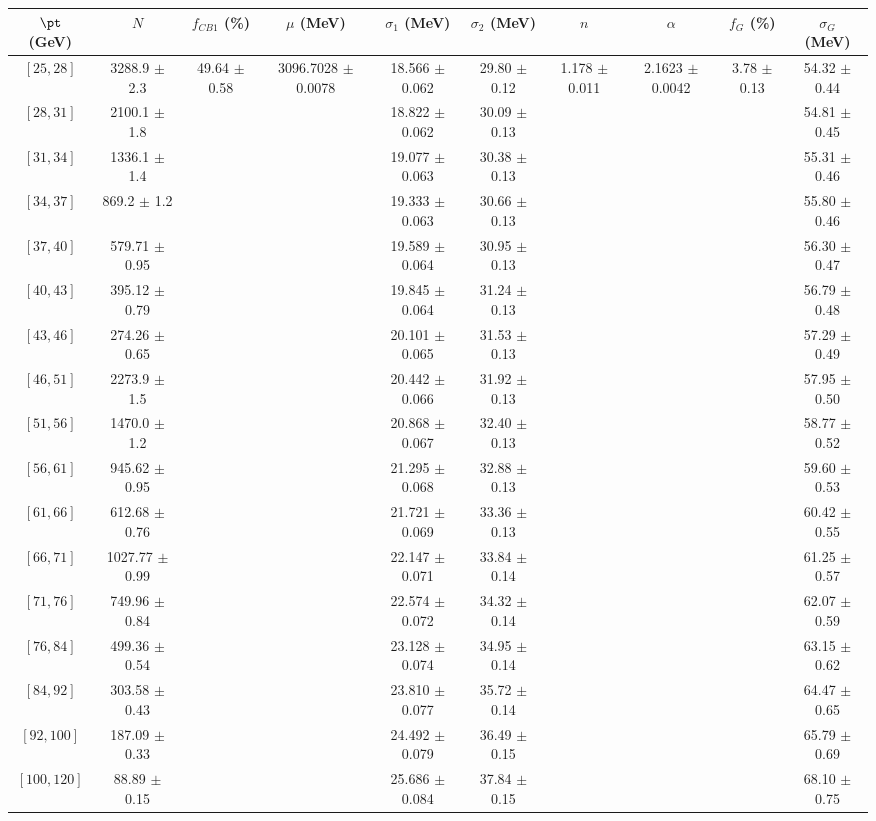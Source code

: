 \begin{tabular}{c||c|c|c|c|c|c|c|c|c}
$\pt$ (GeV) & $N$ & $f_{CB1}$ (\%)  & $\mu$ (MeV) & $\sigma_1$ (MeV) & $\sigma_2$ (MeV) & $n$ & $\alpha$ & $f_G$ (\%) & $\sigma_G$ (MeV) \\
\hline
$[25, 28]$ & 3288.9 $\pm$ 2.3 & \multirow{17}{*}{49.64 $\pm$ 0.58} & \multirow{17}{*}{3096.7028 $\pm$ 0.0078} & 18.566 $\pm$ 0.062 & 29.80 $\pm$ 0.12 & \multirow{17}{*}{1.178 $\pm$ 0.011} & \multirow{17}{*}{2.1623 $\pm$ 0.0042} & \multirow{17}{*}{3.78 $\pm$ 0.13} & 54.32 $\pm$ 0.44\\
$[28, 31]$ & 2100.1 $\pm$ 1.8 &  &  & 18.822 $\pm$ 0.062 & 30.09 $\pm$ 0.13 &  &  &  & 54.81 $\pm$ 0.45\\
$[31, 34]$ & 1336.1 $\pm$ 1.4 &  &  & 19.077 $\pm$ 0.063 & 30.38 $\pm$ 0.13 &  &  &  & 55.31 $\pm$ 0.46\\
$[34, 37]$ & 869.2 $\pm$ 1.2 &  &  & 19.333 $\pm$ 0.063 & 30.66 $\pm$ 0.13 &  &  &  & 55.80 $\pm$ 0.46\\
$[37, 40]$ & 579.71 $\pm$ 0.95 &  &  & 19.589 $\pm$ 0.064 & 30.95 $\pm$ 0.13 &  &  &  & 56.30 $\pm$ 0.47\\
$[40, 43]$ & 395.12 $\pm$ 0.79 &  &  & 19.845 $\pm$ 0.064 & 31.24 $\pm$ 0.13 &  &  &  & 56.79 $\pm$ 0.48\\
$[43, 46]$ & 274.26 $\pm$ 0.65 &  &  & 20.101 $\pm$ 0.065 & 31.53 $\pm$ 0.13 &  &  &  & 57.29 $\pm$ 0.49\\
$[46, 51]$ & 2273.9 $\pm$ 1.5 &  &  & 20.442 $\pm$ 0.066 & 31.92 $\pm$ 0.13 &  &  &  & 57.95 $\pm$ 0.50\\
$[51, 56]$ & 1470.0 $\pm$ 1.2 &  &  & 20.868 $\pm$ 0.067 & 32.40 $\pm$ 0.13 &  &  &  & 58.77 $\pm$ 0.52\\
$[56, 61]$ & 945.62 $\pm$ 0.95 &  &  & 21.295 $\pm$ 0.068 & 32.88 $\pm$ 0.13 &  &  &  & 59.60 $\pm$ 0.53\\
$[61, 66]$ & 612.68 $\pm$ 0.76 &  &  & 21.721 $\pm$ 0.069 & 33.36 $\pm$ 0.13 &  &  &  & 60.42 $\pm$ 0.55\\
$[66, 71]$ & 1027.77 $\pm$ 0.99 &  &  & 22.147 $\pm$ 0.071 & 33.84 $\pm$ 0.14 &  &  &  & 61.25 $\pm$ 0.57\\
$[71, 76]$ & 749.96 $\pm$ 0.84 &  &  & 22.574 $\pm$ 0.072 & 34.32 $\pm$ 0.14 &  &  &  & 62.07 $\pm$ 0.59\\
$[76, 84]$ & 499.36 $\pm$ 0.54 &  &  & 23.128 $\pm$ 0.074 & 34.95 $\pm$ 0.14 &  &  &  & 63.15 $\pm$ 0.62\\
$[84, 92]$ & 303.58 $\pm$ 0.43 &  &  & 23.810 $\pm$ 0.077 & 35.72 $\pm$ 0.14 &  &  &  & 64.47 $\pm$ 0.65\\
$[92, 100]$ & 187.09 $\pm$ 0.33 &  &  & 24.492 $\pm$ 0.079 & 36.49 $\pm$ 0.15 &  &  &  & 65.79 $\pm$ 0.69\\
$[100, 120]$ & 88.89 $\pm$ 0.15 &  &  & 25.686 $\pm$ 0.084 & 37.84 $\pm$ 0.15 &  &  &  & 68.10 $\pm$ 0.75\\
\end{tabular}
